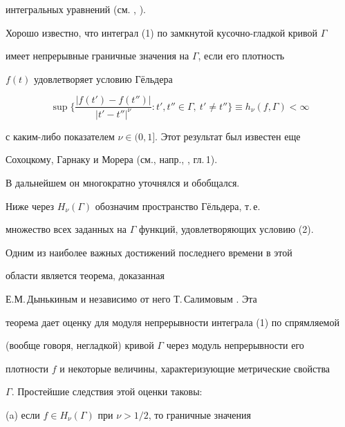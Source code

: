 интегральных уравнений (см. \cite{Ga}, \cite{Mu}).





Хорошо известно, что интеграл (1) по замкнутой кусочно-гладкой кривой $\Gamma$


имеет непрерывные граничные значения на $\Gamma$, если его плотность


$f(t)$ удовлетворяет условию Г\"ельдера


\begin{equation}


\sup \bigg\{\frac{\left| f(t')-f(t'')\right|}{\left| t'-t''\right|^{\nu}}


: t',t''\in \Gamma,\ t'\ne t''\bigg\}\equiv h_{\nu}(f,\Gamma)<\infty


\end{equation}


с каким-либо показателем $\nu\in (0,1]$. Этот результат был известен еще


Сохоцкому, Гарнаку и Морера (см., напр., \cite{Mu}, гл.\,1).





В дальнейшем он многократно уточнялся и обобщался.





Ниже через $H_{\nu}(\Gamma)$ обозначим пространство Г\"ельдера, т.\,е.


множество всех заданных на $\Gamma$ функций, удовлетворяющих условию (2).





Одним из наиболее важных достижений последнего времени в этой


области является теорема, доказанная


Е.М.\,Дынькиным \cite{Dy} и независимо от него Т.\,Салимовым \cite{Sa}. Эта


теорема дает оценку для модуля непрерывности интеграла (1) по спрямляемой


(вообще говоря, негладкой) кривой $\Gamma$ через модуль непрерывности его


плотности $f$ и некоторые величины, характеризующие метрические свойства


$\Gamma$. Простейшие следствия этой оценки таковы:





(a) если $f\in H_{\nu}(\Gamma)$ при $\nu > 1/2$, то граничные значения


